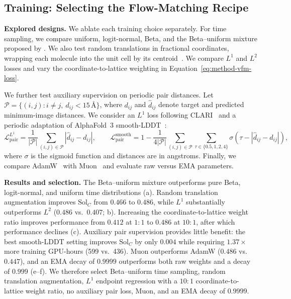 \subsection{Training: Selecting the Flow-Matching Recipe}
\label{sec:recipe-training}

\textbf{Explored designs.}
We ablate each training choice separately. For time sampling, we compare uniform,
logit-normal, Beta, and the Beta--uniform mixture proposed by
\citet{geffner2025proteina}. We also test
random translations in fractional coordinates, wrapping each molecule into the
unit cell by its centroid~\citep{gruver2024finetuned}. We compare $L^1$ and $L^2$ losses and vary the coordinate-to-lattice weighting in Equation~\eqref{eq:method-vfm-loss}.

We further test auxiliary supervision on periodic pair distances. Let
$\mathcal{P}=\{(i,j):i\ne j,\ d_{ij}<15\,\text{\AA}\}$, where $d_{ij}$ and
$\hat d_{ij}$ denote target and predicted minimum-image distances. We consider an
$L^1$ loss following CLARI~\citep{lo2026clari} and a periodic adaptation of
AlphaFold~3 smooth-LDDT~\citep{Abramson2024}:
\begin{equation}
    \mathcal{L}_{\mathrm{pair}}^{L^1}
    = \frac{1}{|\mathcal{P}|}\sum_{(i,j)\in\mathcal{P}}
      \left|\hat d_{ij}-d_{ij}\right|,
    \qquad
    \mathcal{L}_{\mathrm{pair}}^{\mathrm{smooth}}
    = 1-\frac{1}{4|\mathcal{P}|}\sum_{(i,j)\in\mathcal{P}}
      \sum_{\tau\in\{0.5,1,2,4\}}
      \sigma\!\left(\tau-\left|\hat d_{ij}-d_{ij}\right|\right),
    \label{eq:training-pair-losses}
\end{equation}
where $\sigma$ is the sigmoid function and distances are in angstroms.
Finally, we compare AdamW~\citep{loshchilov2019decoupled} with
Muon~\citep{liu2025muon} and evaluate raw versus EMA parameters.

\textbf{Results and selection.}
The Beta--uniform mixture outperforms pure Beta, logit-normal, and uniform time
distributions (a). Random translation
augmentation improves $\mathrm{Sol}_C$ from $0.466$ to $0.486$, while $L^1$
substantially outperforms $L^2$ ($0.486$ vs.\ $0.407$;
b). Increasing the coordinate-to-lattice
weight ratio improves performance from $0.412$ at $1{:}1$ to $0.486$ at
$10{:}1$, after which performance declines
(c). Auxiliary pair supervision provides
little benefit: the best smooth-LDDT setting improves $\mathrm{Sol}_C$ by only
$0.004$ while requiring $1.37\times$ more training GPU-hours (599 vs.\ 436). Muon outperforms AdamW ($0.486$ vs.\ $0.447$), and an EMA decay of $0.9999$ outperforms both raw
weights and a decay of $0.999$ (e--f). We
therefore select Beta--uniform time sampling, random translation augmentation,
$L^1$ endpoint regression with a $10{:}1$ coordinate-to-lattice weight ratio,
no auxiliary pair loss, Muon, and an EMA decay of $0.9999$.


